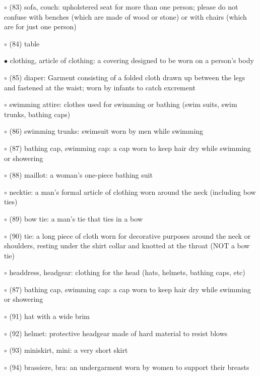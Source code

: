 \noindent \leftskip=0.25cm $\circ$ (83) sofa, couch: upholstered seat for more than one person; please do not confuse with benches (which are made of wood or stone) or with chairs (which are for just one person)

\noindent \leftskip=0.25cm $\circ$ (84) table

\noindent \leftskip=0.0cm $\bullet$ clothing, article of clothing: a covering designed to be worn on a person's body

\noindent \leftskip=0.25cm $\circ$ (85) diaper: Garment consisting of a folded cloth drawn up between the legs and fastened at the waist; worn by infants to catch excrement

\noindent \leftskip=0.25cm $\circ$ swimming attire: clothes used for swimming or bathing (swim suits, swim trunks, bathing caps)

\noindent \leftskip=0.5cm $\circ$ (86) swimming trunks: swimsuit worn by men while swimming

\noindent \leftskip=0.5cm $\circ$ (87) bathing cap, swimming cap: a cap worn to keep hair dry while swimming or showering

\noindent \leftskip=0.5cm $\circ$ (88) maillot: a woman's one-piece bathing suit

\noindent \leftskip=0.25cm $\circ$ necktie: a man's formal article of clothing worn around the neck (including bow ties)

\noindent \leftskip=0.5cm $\circ$ (89) bow tie: a man's tie that ties in a bow

\noindent \leftskip=0.5cm $\circ$ (90) tie: a long piece of cloth worn for decorative purposes around the neck or shoulders, resting under the shirt collar and knotted at the throat (NOT a bow tie)

\noindent \leftskip=0.25cm $\circ$ headdress, headgear: clothing for the head (hats, helmets, bathing caps, etc)

\noindent \leftskip=0.5cm $\circ$ (87) bathing cap, swimming cap: a cap worn to keep hair dry while swimming or showering

\noindent \leftskip=0.5cm $\circ$ (91) hat with a wide brim

\noindent \leftskip=0.5cm $\circ$ (92) helmet: protective headgear made of hard material to resist blows

\noindent \leftskip=0.25cm $\circ$ (93) miniskirt, mini: a very short skirt

\noindent \leftskip=0.25cm $\circ$ (94) brassiere, bra: an undergarment worn by women to support their breasts

